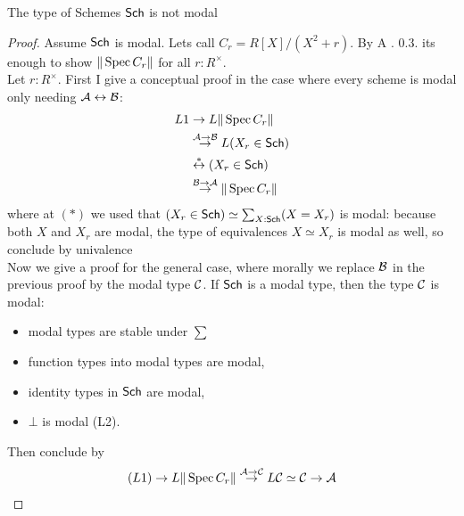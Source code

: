 \begin{corollary}
	The type of Schemes $\mathsf{Sch}$ is not modal
\end{corollary}
\begin{proof}
	Assume $\mathsf{Sch}$ is modal. Lets call $C_r = R[X] / (X^2 + r)$.  By \cite{cherubini2023foundationsyntheticalgebraicgeometry} A . 0.3. its enough to show $\|\operatorname{Spec} C_r\|$ for all $r : R^\times$. \\
	Let $r : R^\times$. %
	First I give a conceptual proof in the case where every scheme is modal only needing $\mathcal{A} \leftrightarrow \mathcal{B}$:
	\begin{align*}
		L1 &\rightarrow L \| \operatorname{Spec} C_r\| \\
		&\overset{\mathcal{A} \rightarrow \mathcal{B}}{\rightarrow} L (X_r \in \mathsf{Sch}) \\
		& \overset{*}{\leftrightarrow} (X_r \in \mathsf{Sch} ) \\
		&\overset{\mathcal{B} \rightarrow \mathcal{A}}{\rightarrow} \|\operatorname{Spec} C_r\| \\
	\end{align*}
	where at $(*)$ we used that $(X_r \in \mathsf{Sch}) \simeq \sum_{X: \mathsf{Sch}} (X = X_r)$ is modal: because both $X$ and $X_r$ are modal, the type of equivalences $X \simeq X_r$ is modal as well, so conclude by univalence \\
	
	Now we give a proof for the general case, where morally we replace $\mathcal{B}$ in the previous proof by the modal type $\mathcal{C}$. 
	If $\mathsf{Sch}$ is a modal type, then the type $\mathcal{C}$ is modal:
	\begin{itemize}
		\item modal types are stable under $\sum$
		\item function types into modal types are modal,
		\item identity types in $\mathsf{Sch}$ are modal, 
		\item $\bot$ is modal (L2).
	\end{itemize}
	Then conclude by
	\begin{align*}
		(L1) \to L \|\operatorname{Spec} C_r\| \overset{\mathcal{A} \to \mathcal{C}}{\to} L \mathcal{C} \simeq \mathcal{C} \to \mathcal{A}
	\end{align*}
\end{proof}